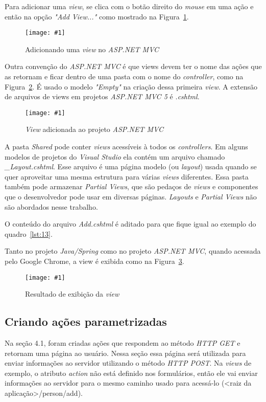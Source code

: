 \documentclass[a4paper,12pt]{article}
\newcommand{\figura}[3] {
	\begin{figure}[ht]
		\centering
		\texttt{[image: \#1]}
		\caption{#2}
		\label{#3}
	\end{figure}
	\FloatBarrier
}
\newcommand{\est}[1] {
\textit{#1}}
\newcommand{\arquivo}[1] {
\textit{#1}}
\newcommand{\razorcode}[3] {
	
}
\begin{document}
Para adicionar uma \est{view}, se clica com o botão direito do \est{mouse} em uma ação e então na opção \est{"Add View..."} como mostrado na Figura~\ref{fig:26}. 

\figura{26.png}{Adicionando uma \est{view} no \est{ASP.NET MVC}}{fig:26}

Outra convenção do \est{ASP.NET MVC} é que views devem ter o nome das ações que as retornam e ficar dentro de uma pasta com o nome do \est{controller}, como na Figura~\ref{fig:27}. É usado o modelo \est{"Empty"} na criação dessa primeira \est{view}. A extensão de arquivos de views em projetos \est{ASP.NET MVC 5} é \arquivo{.cshtml}.

\figura{27.png}{\est{View} adicionada ao projeto \est{ASP.NET MVC}}{fig:27}

A pasta \arquivo{Shared} pode conter \est{views} acessíveis à todos os \est{controllers}. Em alguns modelos de projetos do \est{Visual Studio} ela contém um arquivo chamado \arquivo{\_Layout.cshtml}. Esse arquivo é uma página modelo (ou \est{layout}) usada quando se quer aproveitar uma mesma estrutura para várias \est{views} diferentes. Essa pasta também pode armazenar \est{Partial Views}, que são pedaços de \est{views} e componentes que o desenvolvedor pode usar em diversas páginas. \est{Layouts} e \est{Partial Views} não são abordados nesse trabalho.

O conteúdo do arquivo \arquivo{Add.cshtml} é aditado para que fique igual ao exemplo do quadro~\ref{lst:13}.

\razorcode{code/13.txt}{O arquivo \arquivo{Add.cshtml}}{lst:13}

Tanto no projeto \est{Java/Spring} como no projeto \est{ASP.NET MVC}, quando acessada pelo Google Chrome, a view é exibida como na Figura~\ref{fig:28}. 

\figura{28.png}{Resultado de exibição da \est{view}}{fig:28}

\subsection{Criando ações parametrizadas}

Na seção 4.1, foram criadas ações que respondem ao método \est{HTTP GET} e retornam uma página ao usuário. Nessa seção essa página será utilizada para enviar informações ao servidor utilizando o método \est{HTTP POST}. Na \est{views} de exemplo, o atributo \est{action} não está definido nos formulários, então ele vai enviar informações ao servidor para o mesmo caminho usado para acessá-lo (<raiz da aplicação>/person/add).
\end{document}
